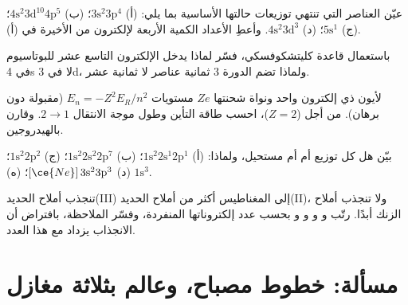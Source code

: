 \begin{exercise}[$\star\star$]\label{exo:b1:quantum-numbers:8}
عيّن العناصر التي تنتهي توزيعات حالتها الأساسية بما يلي:
(أ) $3\text{s}^2 3\text{p}^4$؛ (ب) $4\text{s}^2 3\text{d}^{10} 4\text{p}^5$؛
(ج) $5\text{s}^1$؛ (د) $4\text{s}^2 3\text{d}^3$. وأعطِ الأعداد الكمية
الأربعة لإلكترون من  الأخيرة في (أ).
\end{exercise}

\begin{exercise}[$\star\star$]\label{exo:b1:quantum-numbers:9}
باستعمال قاعدة كليتشكوفسكي، فسّر لماذا يدخل الإلكترون التاسع عشر
للبوتاسيوم في 4s لا في 3d، ولماذا تضم الدورة 3 ثمانية عناصر
لا ثمانية عشر.
\end{exercise}

\begin{exercise}[$\star\star\star$]\label{exo:b1:quantum-numbers:10}
لأيون ذي إلكترون واحد ونواة شحنتها $Ze$ مستويات
$E_n = -Z^2 E_R/n^2$ (مقبولة دون برهان). من أجل  ($Z = 2$)، احسب
طاقة التأين وطول موجة الانتقال $2 \to 1$.
وقارن بالهيدروجين.
\end{exercise}

\begin{exercise}[$\star\star\star$]\label{exo:b1:quantum-numbers:11}
بيّن هل كل توزيع  أم  أم مستحيل، ولماذا: (أ) $1\text{s}^2 2\text{s}^1 2\text{p}^1$؛
(ب) $1\text{s}^2 2\text{s}^2 2\text{p}^7$؛ (ج) $1\text{s}^2 2\text{p}^2$؛
(د) $[\ce{Ne}]\,3\text{s}^2 3\text{p}^3$؛ (ه) $1\text{s}^3$.
\end{exercise}

\begin{exercise}[$\star\star\star$]\label{exo:b1:quantum-numbers:12}
تنجذب أملاح الحديد(III) إلى المغناطيس أكثر من أملاح الحديد(II)،
ولا تنجذب أملاح الزنك أبدًا. رتّب  و
و و و بحسب عدد إلكتروناتها
المنفردة، وفسّر الملاحظة، بافتراض أن الانجذاب يزداد
مع هذا العدد.
\end{exercise}

\section{مسألة: خطوط مصباح، وعالم بثلاثة مغازل}

